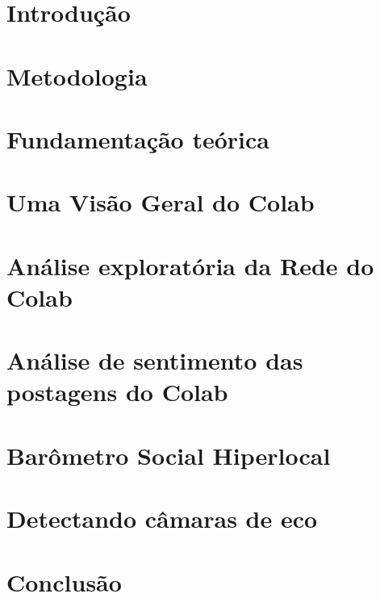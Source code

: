 \documentclass[mestrado, pre-defesa]{packages/icmc}
\begin{document}
\textual

\chapter{Introdução}
\label{chapter:01_introducao}


\chapter{Metodologia}
\label{chapter:02_metodologia}


\chapter{Fundamentação teórica}
\label{chapter:03_networkanalysis}


\chapter{Uma Visão Geral do Colab}
\label{chapter:04_colab}


\chapter{Análise exploratória da Rede do Colab}
\label{chapter:05_exploratory}


\chapter{Análise de sentimento das postagens do Colab}
\label{chapter:06_sentiment}


\chapter{Barômetro Social Hiperlocal}
\label{chapter:07_hyperlocalbarometer}


\chapter{Detectando câmaras de eco}
\label{chapter:08_echochamberdetection}


\chapter{Conclusão}
\label{chapter:09_conclusion}

\end{document}
